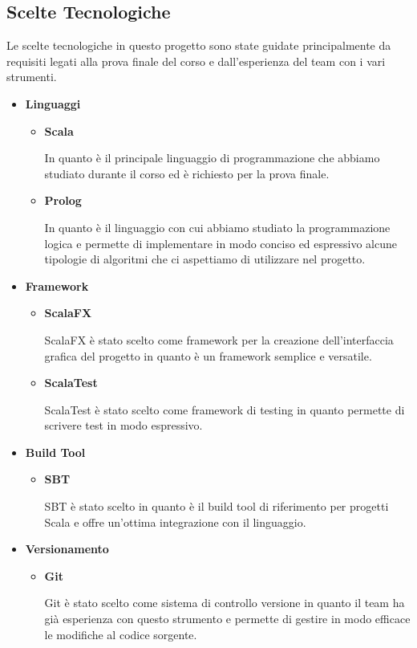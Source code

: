 \subsection{Scelte Tecnologiche}
Le scelte tecnologiche in questo progetto sono state guidate
principalmente da requisiti legati alla prova finale del corso e
dall'esperienza del team con i vari strumenti.
\begin{itemize}
    \item \textbf{Linguaggi}\par
    \begin{itemize}
        \item \textbf{Scala}\par
        In quanto è il principale linguaggio di programmazione che abbiamo 
        studiato durante il corso ed è richiesto per la prova finale.
        \item \textbf{Prolog}\par
        In quanto è il linguaggio con cui abbiamo studiato la programmazione
        logica e permette di implementare in modo conciso ed espressivo
        alcune tipologie di algoritmi che ci aspettiamo di utilizzare
        nel progetto.
    \end{itemize}
    \item \textbf{Framework}\par
    \begin{itemize}
        \item \textbf{ScalaFX}\par
        ScalaFX è stato scelto come framework per la creazione
        dell'interfaccia grafica del progetto in quanto è un framework
        semplice e versatile.
        \item \textbf{ScalaTest}\par
        ScalaTest è stato scelto come framework di testing in quanto
        permette di scrivere test in modo espressivo.
    \end{itemize}
    \item \textbf{Build Tool}\par
    \begin{itemize}
        \item \textbf{SBT}\par
        SBT è stato scelto in quanto è il build tool di
        riferimento per progetti Scala e offre un'ottima integrazione
        con il linguaggio.
    \end{itemize}\par
    \item \textbf{Versionamento}\par
    \begin{itemize}
        \item \textbf{Git}\par
        Git è stato scelto come sistema di controllo versione in quanto
        il team ha già esperienza con questo strumento e permette 
        di gestire in modo efficace le modifiche al codice sorgente.


\end{itemize}
\end{itemize}
